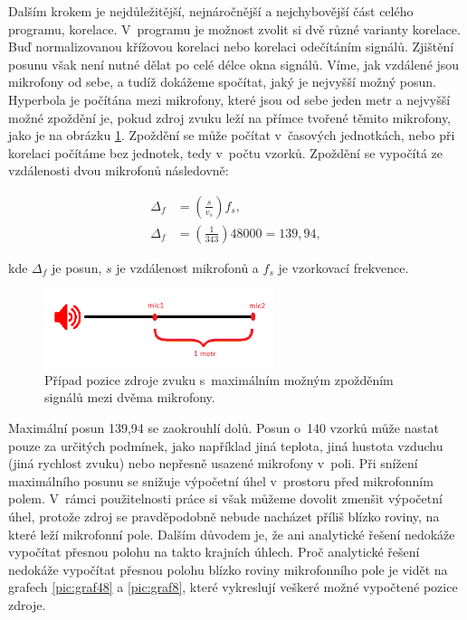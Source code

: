 Dalším krokem je nejdůležitější, nejnáročnější a nejchybovější část celého programu, korelace. V~programu je možnost zvolit si dvě různé varianty korelace. Buď normalizovanou křížovou korelaci nebo korelaci odečítáním signálů. Zjištění posunu však není nutné dělat po celé délce okna signálů. Víme, jak vzdálené jsou mikrofony od sebe, a tudíž dokážeme spočítat, jaký je nejvyšší možný posun. Hyperbola je počítána mezi mikrofony, které jsou od sebe jeden metr a nejvyšší možné zpoždění je, pokud zdroj zvuku leží na přímce tvořené těmito mikrofony, jako je na obrázku \ref{pic:posun}. Zpoždění se může počítat v~časových jednotkách, nebo při korelaci počítáme bez jednotek, tedy v~počtu vzorků. Zpoždění se vypočítá ze vzdálenosti dvou mikrofonů následovně:

\begin{align}
    \label{eq:maxposun}
    \Delta_f&=(\frac{s}{v_s})f_s, \\
    \Delta_f&=(\frac{1}{343})48000=139,94,
\end{align}

kde $\Delta_f$ je posun, $s$ je vzdálenost mikrofonů a $f_s$ je vzorkovací frekvence.

\begin{figure}[hbt]
	\centering
	\includegraphics[width=0.6\textwidth]{obrazky-figures/maxRozdil_mikrofonu.png}
	\caption{Případ pozice zdroje zvuku s~maximálním možným zpožděním signálů mezi dvěma mikrofony.}
	\label{pic:posun}
\end{figure}

Maximální posun 139,94 se zaokrouhlí dolů. Posun o~140 vzorků může nastat pouze za určitých podmínek, jako například jiná teplota, jiná hustota vzduchu (jiná rychlost zvuku) nebo nepřesně usazené mikrofony v~poli. Při snížení maximálního posunu se snižuje výpočetní úhel v~prostoru před mikrofonním polem. V~rámci použitelnosti práce si však můžeme dovolit zmenšit výpočetní úhel, protože zdroj se pravděpodobně nebude nacházet příliš blízko roviny, na které leží mikrofonní pole. Dalším důvodem je, že ani analytické řešení nedokáže vypočítat přesnou polohu na takto krajních úhlech. Proč analytické řešení nedokáže vypočítat přesnou polohu blízko roviny mikrofonního pole je vidět na grafech \ref{pic:graf48} a \ref{pic:graf8}, které vykreslují veškeré možné vypočtené pozice zdroje.

